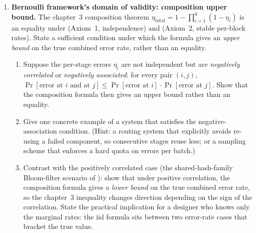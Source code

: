 \begin{enumerate}
\item \exstarstarstar
\label{ex:ch16-11}
\textbf{Bernoulli framework's domain of validity: composition
upper bound.}
The chapter~3 composition theorem 
$\eta_{\text{total}} = 1 - \prod_{i = 1}^{k} (1 - \eta_i)$ is an
equality under  (Axiom~1, independence)
and  (Axiom~2, stable per-block rates).
State a sufficient condition under which the formula gives an
\emph{upper bound} on the true combined error rate, rather than
an equality.
\begin{enumerate}
  \item[(a)] Suppose the per-stage errors $\eta_i$ are not
    independent but are \emph{negatively correlated} or
    \emph{negatively associated}: for every pair $(i, j)$,
    $\Pr[\text{error at } i \text{ and at } j] \le \Pr[\text{error
    at } i] \cdot \Pr[\text{error at } j]$. Show that the
    composition formula then gives an upper bound rather than an
    equality.
  \item[(b)] Give one concrete example of a system that satisfies
    the negative-association condition. (Hint: a routing system
    that explicitly avoids re-using a failed component, so
    consecutive stages reuse less; or a sampling scheme that
    enforces a hard quota on errors per batch.)
  \item[(c)] Contrast with the positively correlated case (the
    shared-hash-family Bloom-filter scenario of
    ): show that under positive
    correlation, the composition formula gives a \emph{lower
    bound} on the true combined error rate, so the chapter~3
    inequality changes direction depending on the sign of the
    correlation. State the practical implication for a designer
    who knows only the marginal rates: the iid formula sits
    between two error-rate cases that bracket the true value.
\end{enumerate}

\end{enumerate}
